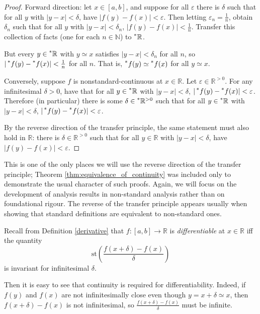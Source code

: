 \documentclass[11pt]{amsart}
\theoremstyle{remark}
\newcommand{\st}{\mathrm{st}}
\newcommand{\hyp}[1][\mathbb{R}]{\prescript{*}{}{#1}}
\newcommand{\near}{\simeq}
\begin{document}
\begin{proof}
Forward direction: let $x \in [a,b]$, and suppose for all $\varepsilon$ there is $\delta$ such that for all $y$ with $|y-x| < \delta$, have $|f(y)-f(x)| < \varepsilon$.
Then letting $\varepsilon_n = \frac{1}{n}$, obtain $\delta_n$ such that for all $y$ with $|y-x| < \delta_n$, $|f(y) -f(x) | < \frac{1}{n}$.
Transfer this collection of facts (one for each $n \in \mathbb{N}$) to $\hyp$.

But every $y \in \hyp$ with $y \near x$ satisfies $|y-x| < \delta_n$ for all $n$, so $|\hyp[f](y) - \hyp[f](x)| < \frac{1}{n}$ for all $n$.
That is, $\hyp[f](y) \near \hyp[f](x)$ for all $y \near x$.

Conversely, suppose $f$ is nonstandard-continuous at $x \in \mathbb{R}$.
Let $\varepsilon \in \mathbb{R}^{>0}$.
For any infinitesimal $\delta > 0$, have that for all $y \in \hyp$ with $|y-x| < \delta$, $| \hyp[f](y) - \hyp[f](x)| < \varepsilon$.
Therefore (in particular) there is some $\delta \in \hyp^{>0}$ such that for all $y \in \hyp$ with $|y-x| < \delta$, $| \hyp[f](y) - \hyp[f](x)| < \varepsilon$.

By the reverse direction of the transfer principle, the same statement must also hold in $\mathbb{R}$:
there is $\delta \in \mathbb{R}^{>0}$ such that for all $y \in \mathbb{R}$ with $|y-x| < \delta$, have $|f(y) - f(x)| < \varepsilon$.

\end{proof}

This is one of the only places we will use the reverse direction of the transfer principle; Theorem \ref{thm:equivalence_of_continuity} was included only to demonstrate the usual character of such proofs.
Again, we will focus on the development of analysis results in non-standard analysis rather than on foundational rigour.
The reverse of the transfer principle appears usually when showing that standard definitions are equivalent to non-standard ones.

Recall from Definition \ref{derivative} that $f: [a,b] \to \mathbb{R}$ is \emph{differentiable} at $x \in \mathbb{R}$ iff the quantity $$\st \left( \frac{f(x+\delta) - f(x)}{\delta} \right)$$
is invariant for infinitesimal $\delta$.

Then it is easy to see that continuity is required for differentiability.
Indeed, if $f(y)$ and $f(x)$ are not infinitesimally close even though $y = x+\delta \near x$, then $f(x+\delta) - f(x)$ is not infinitesimal, so $\frac{f(x+\delta) - f(x)}{\delta}$ must be infinite.
\end{document}
